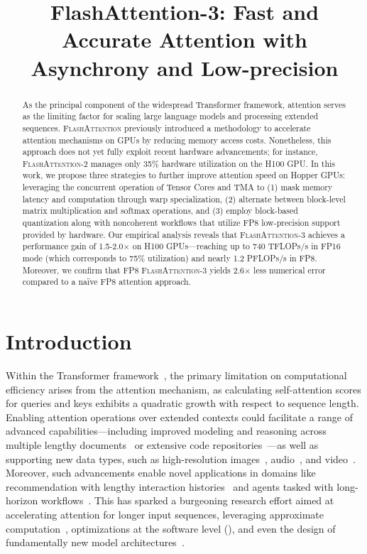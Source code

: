 \title{FlashAttention-3: Fast and Accurate Attention with Asynchrony and Low-precision}

\begin{abstract}
As the principal component of the widespread Transformer framework, attention serves as the limiting factor for scaling large language models and processing extended sequences. \textsc{FlashAttention} previously introduced a methodology to accelerate attention mechanisms on GPUs by reducing memory access costs. Nonetheless, this approach does not yet fully exploit recent hardware advancements; for instance, \textsc{FlashAttention-2} manages only 35\% hardware utilization on the H100 GPU. In this work, we propose three strategies to further improve attention speed on Hopper GPUs: leveraging the concurrent operation of Tensor Cores and TMA to (1) mask memory latency and computation through warp specialization, (2) alternate between block-level matrix multiplication and softmax operations, and (3) employ block-based quantization along with noncoherent workflows that utilize FP8 low-precision support provided by hardware. Our empirical analysis reveals that \textsc{FlashAttention-3} achieves a performance gain of 1.5-2.0$\times$ on H100 GPUs—reaching up to 740 TFLOPs/s in FP16 mode (which corresponds to 75\% utilization) and nearly 1.2 PFLOPs/s in FP8. Moreover, we confirm that FP8 \textsc{FlashAttention-3} yields 2.6$\times$ less numerical error compared to a naïve FP8 attention approach.
\end{abstract}

\section{Introduction}
\label{sec:intro}

Within the Transformer framework~\citep{vaswani2017attention}, the primary limitation on computational efficiency arises from the attention mechanism, as calculating self-attention scores for queries and keys exhibits a quadratic growth with respect to sequence length. Enabling attention operations over extended contexts could facilitate a range of advanced capabilities—including improved modeling and reasoning across multiple lengthy documents~\citep{guo2021longt5,shaham2022scrolls,peng2023yarn} or extensive code repositories~\citep{roziere2023code, li2023starcoder}—as well as supporting new data types, such as high-resolution images~\citep{chen2022scaling}, audio~\citep{gulati2020conformer}, and video~\citep{ho2022video}. Moreover, such advancements enable novel applications in domains like recommendation with lengthy interaction histories~\citep{sun2019bert4rec} and agents tasked with long-horizon workflows~\citep{yao2022react}. This has sparked a burgeoning research effort aimed at accelerating attention for longer input sequences, leveraging approximate computation~\citep{katharopoulos2020transformers,choromanski2020rethinking,
tay2020efficient}, optimizations at the software level (\citep{rabe2021self,dao2022flashattention,kwon2023efficient}), and even the design of fundamentally new model architectures~\citep{peng2023rwkv,sun2023retentive,gu2023mamba}.

